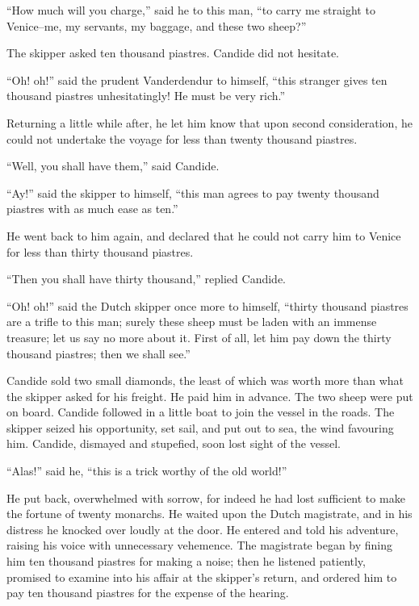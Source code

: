 ``How much will you charge,'' said he to this man, ``to carry me straight to Venice--me, my servants, my baggage, and these two sheep?''

The skipper asked ten thousand piastres. Candide did not hesitate.

``Oh! oh!'' said the prudent Vanderdendur to himself, ``this stranger gives ten thousand piastres unhesitatingly! He must be very rich.''

Returning a little while after, he let him know that upon second consideration, he could not undertake the voyage for less than twenty thousand piastres.

``Well, you shall have them,'' said Candide.

``Ay!'' said the skipper to himself, ``this man agrees to pay twenty thousand piastres with as much ease as ten.''

He went back to him again, and declared that he could not carry him to Venice for less than thirty thousand piastres.

``Then you shall have thirty thousand,'' replied Candide.

``Oh! oh!'' said the Dutch skipper once more to himself, ``thirty thousand piastres are a trifle to this man; surely these sheep must be laden with an immense treasure; let us say no more about it. First of all, let him pay down the thirty thousand piastres; then we shall see.''

Candide sold two small diamonds, the least of which was worth more than what the skipper asked for his freight. He paid him in advance. The two sheep were put on board. Candide followed in a little boat to join the vessel in the roads. The skipper seized his opportunity, set sail, and put out to sea, the wind favouring him. Candide, dismayed and stupefied, soon lost sight of the vessel.

``Alas!'' said he, ``this is a trick worthy of the old world!''

He put back, overwhelmed with sorrow, for indeed he had lost sufficient to make the fortune of twenty monarchs. He waited upon the Dutch magistrate, and in his distress he knocked over loudly at the door. He entered and told his adventure, raising his voice with unnecessary vehemence. The magistrate began by fining him ten thousand piastres for making a noise; then he listened patiently, promised to examine into his affair at the skipper's return, and ordered him to pay ten thousand piastres for the expense of the hearing.

